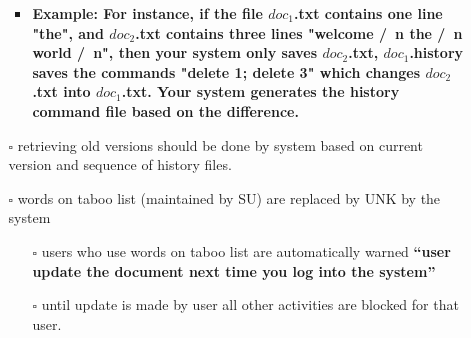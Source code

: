 \documentclass{article}
\begin{document}
\begin{itemize}
\begin{itemize}
\begin{itemize}
				\item \textbf{Example: For instance, if the file $doc_1$.txt contains one line "the", and $doc_2$.txt contains three lines "welcome /\ n the /\ n world /\ n", then your system only saves $doc_2$.txt, $doc_1$.history saves the commands "delete 1; delete 3" which changes $doc_2$.txt into $doc_1$.txt. Your system generates the history command file based on the difference.}
			\end{itemize}
				\item [$\square$] retrieving old versions should be done by system based on current version and sequence of history files.
				\item [$\square$] words on taboo list (maintained by SU) are replaced by UNK by the system
				\begin{itemize}
					\item [$\square$] users who use words on taboo list are automatically warned \textbf{``user update the document next time you log into the system''}
					\item [$\square$] until update is made by user all other activities are blocked for that user.
				\end{itemize}
		\end{itemize}


	\end{itemize}
\end{document}

